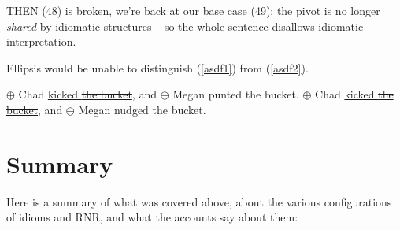 \documentclass[paper=letter, fontsize=12pt]{scrartcl} %
\numberwithin{equation}{section} %
\numberwithin{figure}{section} %
\numberwithin{table}{section} %
\begin{document}
THEN (48) is broken, we're back at our base case (49): the pivot is no longer \textit{shared} by idiomatic structures -- so the whole sentence disallows idiomatic interpretation. {\color{white} \cite{Citko:rnr}}

Ellipsis would be unable to distinguish (\ref{asdf1}) from (\ref{asdf2}).

\begin{exe}
\ex
\begin{xlista}
	\ex $\oplus$ Chad \uline{kicked \sout{the bucket}}, and $\ominus$ Megan punted the bucket.
	\ex $\oplus$ Chad \uline{kicked \sout{the bucket}}, and $\ominus$ Megan nudged the bucket.
\end{xlista}
\end{exe}

%

\section{Summary}

Here is a summary of what was covered above, about the various configurations of idioms and RNR, and what the accounts say about them:
\end{document}
